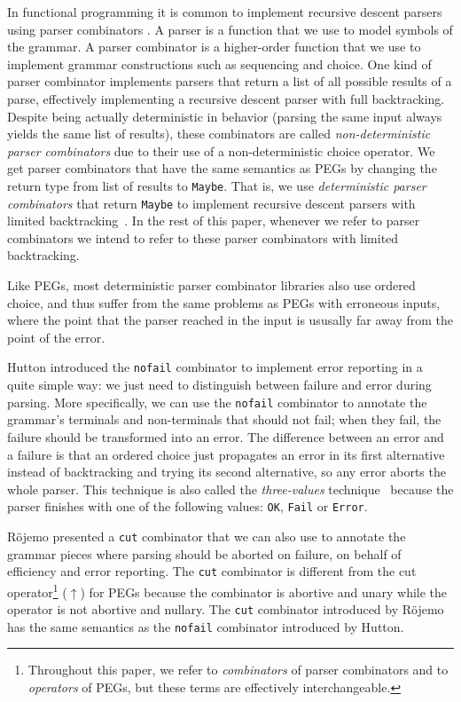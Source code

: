 \documentclass[3p,12pt,singlecolumn]{elsarticle}
\begin{document}
In functional programming it is common to implement recursive
descent parsers using parser combinators \cite{hutton1992hfp}.
A parser is a function that we use to model symbols of the
grammar.
A parser combinator is a higher-order function that we use to
implement grammar constructions such as sequencing and choice.
One kind of parser combinator implements parsers that
return a list of all possible results of a parse, effectively
implementing a recursive descent parser with full backtracking.
Despite being actually deterministic in behavior (parsing the
same input always yields the same list of results), these
combinators are called {\em non-deterministic parser 
combinators} due to their use of a non-deterministic choice operator.
We get parser combinators that have the same semantics as PEGs
by changing the return type from list of results to \texttt{Maybe}.
That is, we use {\em deterministic parser combinators} that return
\texttt{Maybe} to implement recursive descent parsers with limited
backtracking~\cite{spivey2012maybe}. 
In the rest of this paper, whenever we refer to parser combinators
we intend to refer to these parser combinators with limited backtracking.

Like PEGs, most deterministic parser combinator libraries 
also use ordered choice, and thus suffer from the same
problems as PEGs with erroneous inputs, where the point
that the parser reached in the input is ususally far away
from the point of the error.

Hutton \cite{hutton1992hfp} introduced the \texttt{nofail} combinator
to implement error reporting in a quite simple way:
we just need to distinguish between failure and error during parsing.
More specifically, we can use the \texttt{nofail} combinator to
annotate the grammar's terminals and non-terminals that should
not fail; when they fail, the failure should be transformed into an
error. The difference between an error and a failure is that
an ordered choice just propagates an error in its first alternative
instead of backtracking and trying its second alternative, so any
error aborts the whole parser.
This technique is also called the \emph{three-values} technique~\cite{partridge1996fv}
because the parser finishes with one of the following values:
\texttt{OK}, \texttt{Fail} or \texttt{Error}.

Röjemo \cite{rojemo1995epc} presented a \texttt{cut} combinator
that we can also use to annotate the grammar pieces where
parsing should be aborted on failure, on behalf of efficiency and
error reporting.
The \texttt{cut} combinator is different from the cut operator\footnote{Throughout this paper, we refer to {\em combinators}
of parser combinators and to {\em operators} of PEGs, but these terms are effectively interchangeable.} ($\uparrow$) for PEGs because the combinator is abortive and unary
while the operator is not abortive and nullary.
The \texttt{cut} combinator introduced by Röjemo has the same
semantics as the \texttt{nofail} combinator introduced by Hutton.
\end{document}
